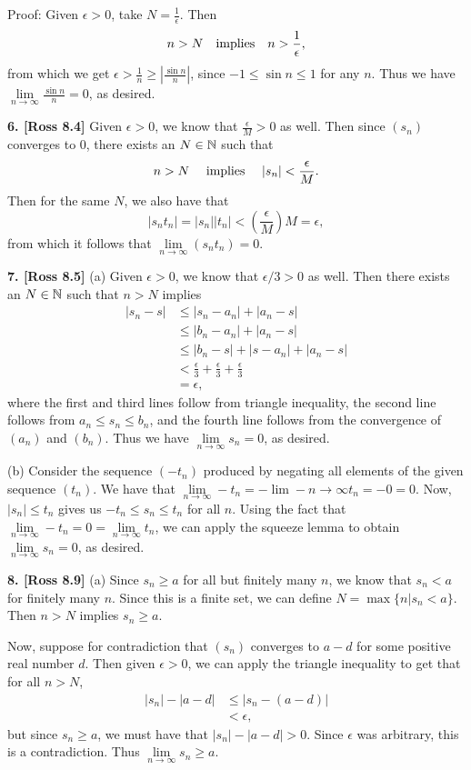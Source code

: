 Proof: Given $\epsilon > 0$, take $N = \frac{1}{\epsilon}$. Then 
\[
n > N \quad\text{implies}\quad n > \frac{1}{\epsilon},
\]
from which we get $\epsilon > \frac{1}{n} \geq \left|\frac{\sin n}{n}\right|$, since $-1 \leq \sin n \leq 1$ for any $n$. Thus we have $\lim\limits_{n \to \infty}\frac{\sin n}{n} = 0$, as desired.

\textbf{6. [Ross 8.4]} Given $\epsilon > 0$, we know that $\frac{\epsilon}{M} > 0$ as well. Then since $(s_n)$ converges to 0, there exists an $N \in \mathbb{N}$ such that
\[
n > N \quad\text{ implies }\quad |s_n| < \frac{\epsilon}{M}.
\]
Then for the same $N$, we also have that
\[
|s_nt_n| = |s_n||t_n| < \left(\frac{\epsilon}{M}\right)M = \epsilon,
\]
from which it follows that $\lim\limits_{n \to \infty}(s_nt_n) = 0$.

\textbf{7. [Ross 8.5]} (a) Given $\epsilon > 0$, we know that $\epsilon/3 > 0$ as well. Then there exists an $N \in \mathbb{N}$ such that $n > N$ implies
\begin{align*}
    |s_n - s| &\leq |s_n - a_n| + |a_n - s| \\
        &\leq |b_n - a_n| + |a_n - s| \\
        &\leq |b_n - s| + |s - a_n| + |a_n - s| \\
        &< \frac{\epsilon}{3} + \frac{\epsilon}{3} + \frac{\epsilon}{3} \\
        &= \epsilon,
\end{align*}
where the first and third lines follow from triangle inequality, the second line follows from $a_n \leq s_n \leq b_n$, and the fourth line follows from the convergence of $(a_n)$ and $(b_n)$. Thus we have $\lim\limits_{n \to \infty}s_n = 0$, as desired.

(b) Consider the sequence $(-t_n)$ produced by negating all elements of the given sequence $(t_n)$. We have that $\lim\limits_{n \to \infty}-t_n = -\lim\limits-{n \to \infty}t_n = -0 = 0$. Now, $|s_n| \leq t_n$ gives us $-t_n \leq s_n \leq t_n$ for all $n$. Using the fact that $\lim\limits_{n \to \infty}-t_n = 0 = \lim\limits_{n \to \infty}t_n$, we can apply the squeeze lemma to obtain $\lim\limits_{n \to \infty}s_n = 0$, as desired.

\textbf{8. [Ross 8.9]} (a) Since $s_n \geq a$ for all but finitely many $n$, we know that $s_n < a$ for finitely many $n$. Since this is a finite set, we can define $N = \max\{n | s_n < a\}$. Then $n > N$ implies $s_n \geq a$. 

Now, suppose for contradiction that $(s_n)$ converges to $a - d$ for some positive real number $d$. Then given $\epsilon > 0$, we can apply the triangle inequality to get that for all $n > N$,
\begin{align*}
    |s_n| - |a - d| &\leq |s_n - (a - d)| \\
        &< \epsilon,
\end{align*}
but since $s_n \geq a$, we must have that $|s_n| - |a - d| > 0$. Since $\epsilon$ was arbitrary, this is a contradiction. Thus $\lim\limits_{n \to \infty}s_n \geq a$.

